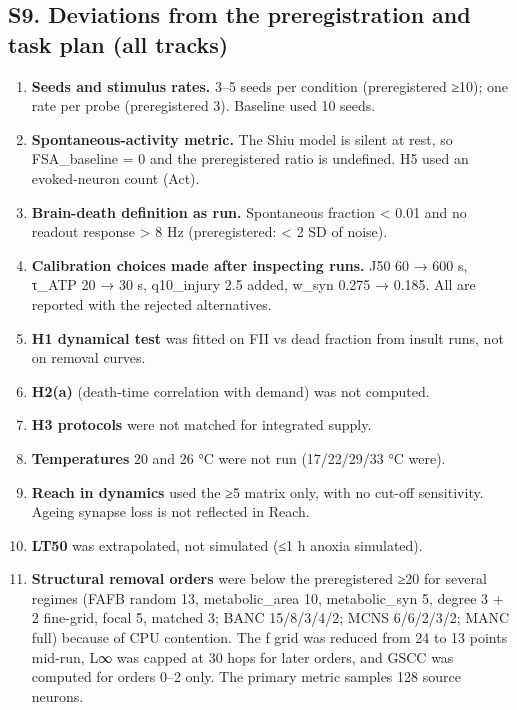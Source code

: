 \documentclass[11pt]{article}
\providecommand{\tightlist}{\setlength{\itemsep}{0pt}\setlength{\parskip}{0pt}}
\begin{document}
\subsection{S9. Deviations from the preregistration and task plan (all tracks)}\label{s9.-deviations-from-the-preregistration-and-task-plan-all-tracks}

\begin{enumerate}
\def\labelenumi{\arabic{enumi}.}
\tightlist
\item
  \textbf{Seeds and stimulus rates.} 3--5 seeds per condition (preregistered ≥10); one rate per probe (preregistered 3). Baseline used 10 seeds.
\item
  \textbf{Spontaneous-activity metric.} The Shiu model is silent at rest, so FSA\_baseline = 0 and the preregistered ratio is undefined. H5 used an evoked-neuron count (Act).
\item
  \textbf{Brain-death definition as run.} Spontaneous fraction \textless{} 0.01 and no readout response \textgreater{} 8 Hz (preregistered: \textless{} 2 SD of noise).
\item
  \textbf{Calibration choices made after inspecting runs.} J50 60 → 600 s, τ\_ATP 20 → 30 s, q10\_injury 2.5 added, w\_syn 0.275 → 0.185. All are reported with the rejected alternatives.
\item
  \textbf{H1 dynamical test} was fitted on FII vs dead fraction from insult runs, not on removal curves.
\item
  \textbf{H2(a)} (death-time correlation with demand) was not computed.
\item
  \textbf{H3 protocols} were not matched for integrated supply.
\item
  \textbf{Temperatures} 20 and 26 °C were not run (17/22/29/33 °C were).
\item
  \textbf{Reach in dynamics} used the ≥5 matrix only, with no cut-off sensitivity. Ageing synapse loss is not reflected in Reach.
\item
  \textbf{LT50} was extrapolated, not simulated (≤1 h anoxia simulated).
\item
  \textbf{Structural removal orders} were below the preregistered ≥20 for several regimes (FAFB random 13, metabolic\_area 10, metabolic\_syn 5, degree 3 + 2 fine-grid, focal 5, matched 3; BANC 15/8/3/4/2; MCNS 6/6/2/3/2; MANC full) because of CPU contention. The f grid was reduced from 24 to 13 points mid-run, L∞ was capped at 30 hops for later orders, and GSCC was computed for orders 0--2 only. The primary metric samples 128 source neurons.

\end{enumerate}
\end{document}
